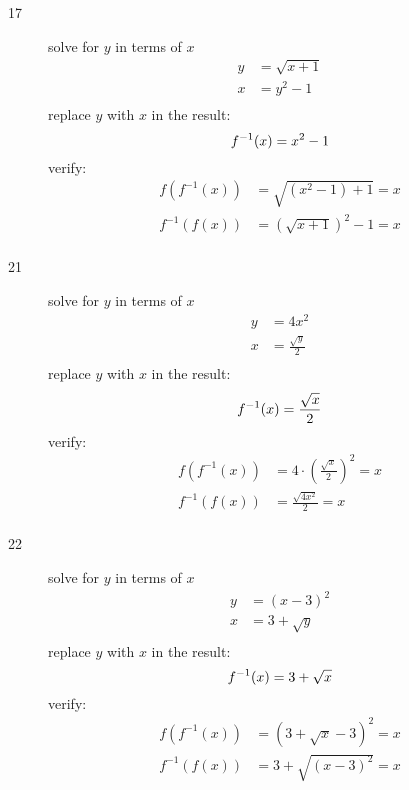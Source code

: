 \documentclass{exam}
\begin{document}
\begin{description}
\item[17]
solve for $y$ in terms of $x$
\begin{align*}
  y &= \sqrt{x + 1} \\
  x &= y^2 - 1 \\
\end{align*}
replace $y$ with $x$ in the result:
\[
  f^{-1}(x) = x^2 - 1 \\
\]
verify:
\begin{align*}
  f(f^{-1}(x))  &= \sqrt{(x^2 - 1) + 1} = x \\
  f^{-1}(f(x)) &= \left(\sqrt{x + 1}\right)^2 - 1 = x \\  
\end{align*}




\item[21]
solve for $y$ in terms of $x$
\begin{align*}
  y &= 4x^2 \\
  x &= \frac{\sqrt{y}}{2} \\
\end{align*}
replace $y$ with $x$ in the result:
\[
  f^{-1}(x) = \frac{\sqrt{x}}{2} \\
\]
verify:
\begin{align*}
  f(f^{-1}(x))  &= 4 \cdot \left( \frac{\sqrt{x}}{2} \right)^2 = x \\
  f^{-1}(f(x)) &= \frac{\sqrt{4x^2}}{2} = x \\  
\end{align*}

\item[22]
solve for $y$ in terms of $x$
\begin{align*}
  y &= (x - 3)^2 \\
  x &= 3 + \sqrt{y} \\
\end{align*}
replace $y$ with $x$ in the result:
\[
  f^{-1}(x) = 3 + \sqrt{x} \\
\]
verify:
\begin{align*}
  f(f^{-1}(x)) &= (3 + \sqrt{x} - 3)^2 = x \\
  f^{-1}(f(x)) &= 3 + \sqrt{(x - 3)^2} = x \\  
\end{align*}


\end{description}
\end{document}
